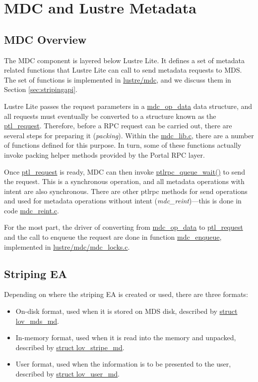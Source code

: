 \section{MDC and Lustre Metadata}
\label{sec:lustre-mdc}

\subsection{MDC Overview}

The MDC component is layered below Lustre Lite. It defines a set of
metadata related functions that Lustre Lite can call to send metadata requests
to MDS.  The set of functions is implemented in \url{lustre/mdc}, and we 
discuss them in Section \ref{sec:stripingapi}.

Lustre Lite passes the request parameters in a \url{mdc_op_data} data
structure, and all requests must eventually be converted to a structure known
as the \url{ptl_request}.  Therefore, before a RPC request can be carried out,
there are several steps for preparing it (\textit{packing}). Within the
\url{mdc_lib.c}, there are a number of functions defined for this purpose. In
turn, some of these functions actually invoke packing helper methods provided
by the Portal RPC layer.

Once \url{ptl_request} is ready, MDC can then invoke \url{ptlrpc_queue_wait()}
to send the request.  This is a synchronous operation, and all metadata
operations with intent are also synchronous.  There are other ptlrpc methods
for send operations and used for metadata operations without intent
(\textit{mdc\_reint})---this is done in code \url{mdc_reint.c}.

For the most part, the driver of converting from \url{mdc_op_data} to
\url{ptl_request} and the call to enqueue the request are done in function
\url{mdc_enqueue}, implemented in \url{lustre/mdc/mdc_locks.c}.


\subsection{Striping EA}
\label{sec:stripingea}

Depending on where the striping EA is created or used, there are three formats:

\begin{itemize}

  \item On-disk format, used when it is stored on MDS disk, described by
\url{struct lov_mds_md}.

  \item In-memory format, used when it is read into the memory and unpacked,
described by \url{struct lov_stripe_md}.

  \item User format, used when the information is to be presented to the user,
described by \url{struct lov_user_md}.

\end{itemize}


